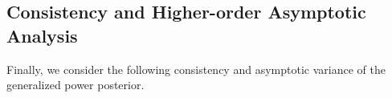 \documentclass[12pt]{article}
\newtheorem{proposition}{Proposition}
\newtheorem{remark}{Remark}
\newtheorem{assumption}{Assumption}
\begin{document}

\subsection{Consistency and Higher-order Asymptotic Analysis}
\label{sec:theory:consistency_and_asymptotic_analysis}
Finally, we consider the following consistency and asymptotic variance of the generalized power posterior.
\end{document}
